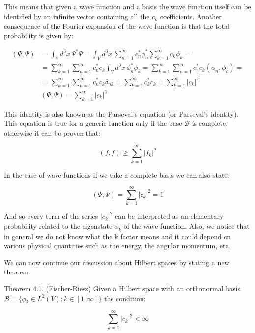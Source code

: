 \documentclass[italian]{HKNdocument}
\begin{document}
This means that given a wave function and a basis the wave function itself can be identified by an infinite vector containing all the $c_k$ coefficients. Another consequence of the Fourier expansion of the wave function is that the total probability is given by:

\begin{align}
(\Psi, \Psi) &= \int_V d^3x\,\Psi^*\Psi = \int_V d^3x\,\sum_{n=1}^{\infty}c_n^*\phi_n^*\sum_{k=1}^{\infty}c_k\phi_k = \\
&= \sum_{k=1}^{\infty}\sum_{n=1}^{\infty}c_n^*c_k\int_V d^3x\,\phi_n^*\phi_k = \sum_{k=1}^{\infty}\sum_{n=1}^{\infty}c_n^*c_k(\phi_n, \phi_k) = \\
&= \sum_{k=1}^{\infty}\sum_{n=1}^{\infty}c_n^*c_k\delta_{nk} = \sum_{k=1}^{\infty}c_k^*c_k = \sum_{k=1}^{\infty}|c_k|^2  \\
&(\Psi, \Psi) = \sum_{k=1}^{\infty}|c_k|^2
\end{align}

This identity is also known as the Parseval's equation (or Parseval's identity). This equation is true for a generic function only if the base $\mathcal{B}$ is complete, otherwise it can be proven that:

\begin{equation}
(f, f) \geq \sum_{k=1}^{\infty}|f_k|^2
\end{equation}

In the case of wave functions if we take a complete basis we can also state:

\begin{equation}
(\Psi, \Psi) = \sum_{k=1}^{\infty}|c_k|^2 = 1
\end{equation}

And so every term of the series $|c_k|^2$ can be interpreted as an elementary probability related to the eigenstate $\phi_k$ of the wave function. Also, we notice that in general we do not know what the k factor means and it could depend on various physical quantities such as the energy, the angular momentum, etc.

We can now continue our discussion about Hilbert spaces by stating a new theorem:

Theorem 4.1. (Fischer-Riesz) Given a Hilbert space with an orthonormal basis $\mathcal{B} = \{\phi_k \in L^2(V): k \in [1,\infty]\}$ the condition:

\begin{equation}
\sum_{k=1}^{\infty}|c_k|^2 < \infty
\end{equation}
\end{document}
